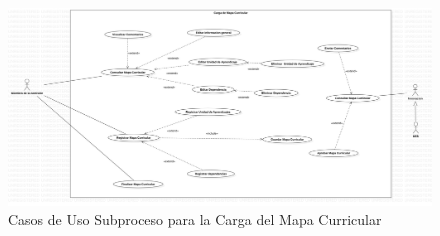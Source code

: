 
\begin{figure}[htbp]
	\begin{center}
		\includegraphics[width=.95\textwidth]{C2-DR/SP4/Image/CasosDeUso}
		\caption{Casos de Uso Subproceso para la  Carga del Mapa Curricular}
		\label{CU-SP4}
	\end{center}
\end{figure}

